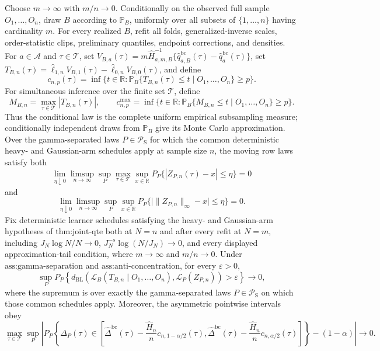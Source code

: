 Choose \(m\to\infty\) with \(m/n\to0\). Conditionally on the observed full sample \(O_1,\ldots,O_n\), draw \(B\) according to \(\mathbb P_B\), uniformly over all subsets of \(\{1,\ldots,n\}\) having cardinality \(m\). For every realized \(B\), refit all folds, generalized-inverse scales, order-statistic clips, preliminary quantiles, endpoint corrections, and densities. For \(a\in\mathcal A\) and \(\tau\in\mathcal T\), set \(V_{B,a}(\tau)=m\widehat H_{a,m,B}^{-1}\{\widehat q_{a,B}^{\mathrm{bc}}(\tau)-\widehat q_a^{\mathrm{bc}}(\tau)\}\), set \(T_{B,n}(\tau)=\widehat\ell_{1,n}V_{B,1}(\tau)-\widehat\ell_{0,n}V_{B,0}(\tau)\), and define
\[
c_{n,p}(\tau)=\inf\{t\in\mathbb R:\mathbb P_B\{T_{B,n}(\tau)\le t\mid O_1,\ldots,O_n\}\ge p\}.
\]
For simultaneous inference over the finite set \(\mathcal T\), define
\[
M_{B,n}=\max_{\tau\in\mathcal T}|T_{B,n}(\tau)|,
\qquad
c^{\max}_{n,p}=\inf\{t\in\mathbb R:\mathbb P_B\{M_{B,n}\le t\mid O_1,\ldots,O_n\}\ge p\}.
\]
Thus the conditional law is the complete uniform empirical subsampling measure; conditionally independent draws from \(\mathbb P_B\) give its Monte Carlo approximation.
Over the gamma-separated laws \(P\in\mathcal P_{\mathrm S}\) for which the common deterministic heavy- and Gaussian-arm schedules apply at sample size \(n\), the moving row laws satisfy both
\[
\lim_{\eta\downarrow0}\limsup_{n\to\infty}\sup_P
\max_{\tau\in\mathcal T}\sup_{x\in\mathbb R}
P_P\{|Z_{P,n}(\tau)-x|\le\eta\}=0
\]
and
\[
\lim_{\eta\downarrow0}\limsup_{n\to\infty}\sup_P
\sup_{x\in\mathbb R}
P_P\{\bigl|\|Z_{P,n}\|_\infty-x\bigr|\le\eta\}=0.
\]
Fix deterministic learner schedules satisfying the heavy- and Gaussian-arm hypotheses of \(\text{thm:joint-qte}\) both at \(N=n\) and after every refit at \(N=m\), including \(J_N\log N/N\to0\), \(J_N^{-s}\log(N/J_N)\to0\), and every displayed approximation-tail condition, where \(m\to\infty\) and \(m/n\to0\). Under \(\text{ass:gamma-separation}\) and \(\text{ass:anti-concentration}\), for every \(\varepsilon>0\),
\[
\sup_P P_P\!\left\{
d_{\mathrm{BL}}\!\left(
\mathcal L_B(T_{B,n}\mid O_1,\ldots,O_n),
\mathcal L_P(Z_{P,n})\right)>\varepsilon\right\}\longrightarrow0,
\]
where the supremum is over exactly the gamma-separated laws \(P\in\mathcal P_{\mathrm S}\) on which those common schedules apply. Moreover, the asymmetric pointwise intervals obey
\[
\max_{\tau\in\mathcal T}\sup_P\left|
P_P\!\left\{\Delta_P(\tau)\in
\left[
\widehat\Delta^{\mathrm{bc}}(\tau)-\frac{\widehat H_n}{n}c_{n,1-\alpha/2}(\tau),
\widehat\Delta^{\mathrm{bc}}(\tau)-\frac{\widehat H_n}{n}c_{n,\alpha/2}(\tau)
\right]\right\}-(1-\alpha)\right|\longrightarrow0.
\]

